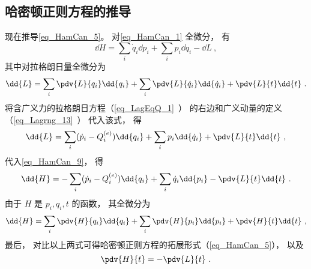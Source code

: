 \subsection{哈密顿正则方程的推导}
现在推导\autoref{eq_HamCan_5}。 对\autoref{eq_HamCan_1} 全微分， 有
\begin{equation}\label{eq_HamCan_9}
\dd{H} = \sum_i \dot q_i \dd{p_i} + \sum_i p_i \dd{\dot q_i} - \dd{L}~,
\end{equation}
其中对拉格朗日量全微分为
\begin{equation}
\dd{L} = \sum_i \pdv{L}{q_i}\dd{q_i} + \sum_i \pdv{L}{\dot q_i}\dd{\dot q_i} + \pdv{L}{t}\dd{t}~.
\end{equation}
将含广义力的拉格朗日方程（\autoref{eq_LagEqQ_1}~） 的右边和广义动量的定义（\autoref{eq_Lagrng_13}~） 代入该式， 得
\begin{equation}
\dd{L} = \sum_i (\dot p_i - Q_i^{(e)})\dd{q_i} + \sum_i p_i\dd{\dot q_i} + \pdv{L}{t}\dd{t}~,
\end{equation}
代入\autoref{eq_HamCan_9}， 得
\begin{equation}
\dd{H} = - \sum_i (\dot p_i - Q_i^{(e)}) \dd{q_i} + \sum_i \dot q_i \dd{p_i}  - \pdv{L}{t}\dd{t}~.
\end{equation}
由于 $H$ 是 $p_i, q_i, t$ 的函数， 其全微分为 
\begin{equation}
\dd{H} = \sum_i \pdv{H}{q_i}\dd{q_i} + \sum_i \pdv{H}{p_i}\dd{p_i} + \pdv{H}{t}\dd{t}~,
\end{equation}
最后， 对比以上两式可得哈密顿正则方程的拓展形式（\autoref{eq_HamCan_5}）， 以及
\begin{equation}
\pdv{H}{t} = - \pdv{L}{t}~.
\end{equation}
